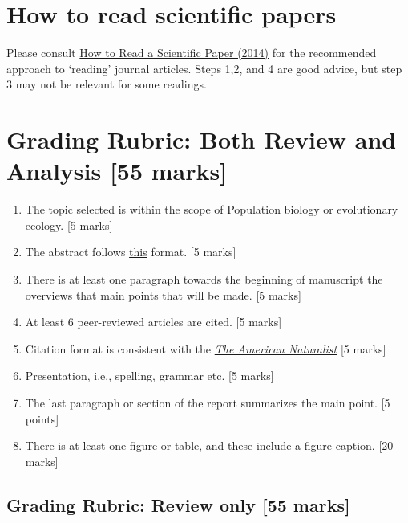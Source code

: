 \documentclass[]{book}
\begin{document}
\section{How to read scientific
papers}\label{how-to-read-scientific-papers}

Please consult
\href{https://www.research4life.org/blog/how-to-read-a-scientific-paper/}{How
to Read a Scientific Paper (2014)} for the recommended approach to
`reading' journal articles. Steps 1,2, and 4 are good advice, but step 3
may not be relevant for some readings.

\section{Grading Rubric: Both Review and Analysis {[}55
marks{]}}\label{grading-rubric-both-review-and-analysis-55-marks}

\begin{enumerate}
\def\labelenumi{\arabic{enumi}.}
\item
  The topic selected is within the scope of Population biology or
  evolutionary ecology. {[}5 marks{]}
\item
  The abstract follows
  \href{https://www.google.com/url?sa=t\&rct=j\&q=\&esrc=s\&source=web\&cd=\&ved=2ahUKEwjH9pDIya_sAhXig-AKHcB3BusQFjAAegQIBhAC\&url=http\%3A\%2F\%2Fwww.cbs.umn.edu\%2Fsites\%2Fdefault\%2Ffiles\%2Fpublic\%2Fdownloads\%2FAnnotated_Nature_abstract.pdf\&usg=AOvVaw2FzVPRcUQOUX2zEJXld9LQ}{this}
  format. {[}5 marks{]}
\item
  There is at least one paragraph towards the beginning of manuscript
  the overviews that main points that will be made. {[}5 marks{]}
\item
  At least 6 peer-reviewed articles are cited. {[}5 marks{]}
\item
  Citation format is consistent with the
  \href{https://www.journals.uchicago.edu/journals/an/instruct?mobileUi=0\#manuscript-format}{\emph{The
  American Naturalist}} {[}5 marks{]}
\item
  Presentation, i.e., spelling, grammar etc. {[}5 marks{]}
\item
  The last paragraph or section of the report summarizes the main point.
  {[}5 points{]}
\item
  There is at least one figure or table, and these include a figure
  caption. {[}20 marks{]}
\end{enumerate}

\subsection{Grading Rubric: Review only {[}55
marks{]}}\label{grading-rubric-review-only-55-marks}
\end{document}
